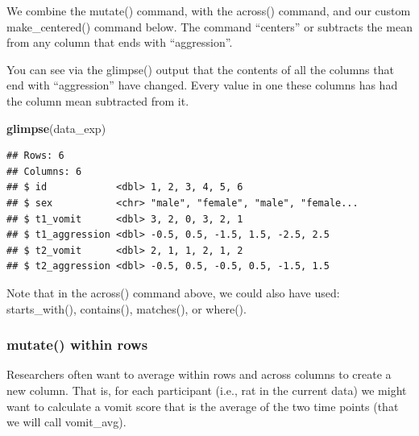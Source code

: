 \documentclass[
]{krantz}
\makeatletter
\newenvironment{Shaded}{\begin{snugshade}}{\end{snugshade}}
\newcommand{\DataTypeTok}[1]{\textcolor[rgb]{0.27,0.27,0.27}{#1}}
\newcommand{\KeywordTok}[1]{\textcolor[rgb]{0.27,0.27,0.27}{\textbf{#1}}}
\newcommand{\NormalTok}[1]{#1}
\newcommand{\OperatorTok}[1]{\textcolor[rgb]{0.43,0.43,0.43}{\textbf{#1}}}
\newcommand{\StringTok}[1]{\textcolor[rgb]{0.5,0.5,0.5}{#1}}
\newenvironment{kframe}{%
\medskip{}
\setlength{\fboxsep}{.8em}
 \def\at@end@of@kframe{}%
 \ifinner\ifhmode%
  \def\at@end@of@kframe{\end{minipage}}%
  \begin{minipage}{\columnwidth}%
 \fi\fi%
 \def\FrameCommand##1{\hskip\@totalleftmargin \hskip-\fboxsep
 \colorbox{shadecolor}{##1}\hskip-\fboxsep
     \hskip-\linewidth \hskip-\@totalleftmargin \hskip\columnwidth}%
 \MakeFramed {\advance\hsize-\width
   \@totalleftmargin\z@ \linewidth\hsize
   \@setminipage}}%
 {\par\unskip\endMakeFramed%
 \at@end@of@kframe}
\renewenvironment{Shaded}{\begin{kframe}}{\end{kframe}}
\makeatother
\begin{document}
We combine the mutate() command, with the across() command, and our custom make\_centered() command below. The command ``centers'' or subtracts the mean from any column that ends with ``aggression''.

\begin{Shaded}
\end{Shaded}

You can see via the glimpse() output that the contents of all the columns that end with ``aggression'' have changed. Every value in one these columns has had the column mean subtracted from it.

\begin{Shaded}
\begin{Highlighting}[]
\KeywordTok{glimpse}\NormalTok{(data_exp)}
\end{Highlighting}
\end{Shaded}

\begin{verbatim}
## Rows: 6
## Columns: 6
## $ id            <dbl> 1, 2, 3, 4, 5, 6
## $ sex           <chr> "male", "female", "male", "female...
## $ t1_vomit      <dbl> 3, 2, 0, 3, 2, 1
## $ t1_aggression <dbl> -0.5, 0.5, -1.5, 1.5, -2.5, 2.5
## $ t2_vomit      <dbl> 2, 1, 1, 2, 1, 2
## $ t2_aggression <dbl> -0.5, 0.5, -0.5, 0.5, -1.5, 1.5
\end{verbatim}

Note that in the across() command above, we could also have used: starts\_with(), contains(), matches(), or where().

\hypertarget{mutate-within-rows}{%
\subsubsection{mutate() within rows}\label{mutate-within-rows}}

Researchers often want to average within rows and across columns to create a new column. That is, for each participant (i.e., rat in the current data) we might want to calculate a vomit score that is the average of the two time points (that we will call vomit\_avg).
\end{document}
